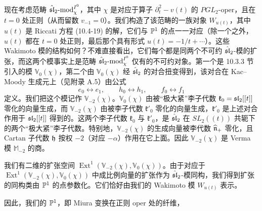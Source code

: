 现在考虑范畴 $\hat{\mathfrak{sl}}_2\text{-}\mathrm{mod}_\chi^{I^0}$，其中 $\chi$ 是对应于算子 $\partial_t^2-v(t)$ 的 $PGL_2$-oper，且在 $t=0$ 处正则（从而留数 $v_{-1}=0$）。我们构造了该范畴的一族对象 $W_{u(t)}$，其中 $u(t)$ 是 Riccati 方程 (10.4-19) 的解，它们与 $\mathbb{P}^1$ 的点一一对应（除一个之外，$u(t)$ 都在 $t=0$ 处正则，最后那个具有形式 $u(t)=-1/t+\cdots$）。这些 Wakimoto 模的结构如何？不难直接看出，它们每个都是同两个不可约 $\hat{\mathfrak{sl}}_2$-模的扩张，而这两个模事实上是范畴 $\hat{\mathfrak{sl}}_2\text{-}\mathrm{mod}_\chi^{I^0}$ 仅有的不可约对象。第一个是 10.3.3 节引入的模 $\mathbb{V}_0(\chi)$，第二个由 $\mathbb{V}_0(\chi)$ 经 $\hat{\mathfrak{sl}}_2$ 的对合扭变得到，该对合在 Kac--Moody 生成元上（见附录 A.5）由公式
\[
    e_0\leftrightarrow e_1,\qquad
    h_0\leftrightarrow h_1,\qquad
    f_0\leftrightarrow f_1
\]
定义。我们把这个模记作 $\mathbb{V}_{-2}(\chi)$。$\mathbb{V}_0(\chi)$ 由被“极大紧”李子代数 $\mathfrak{k}_0=\mathfrak{sl}_2[[t]]$ 零化的向量生成，而 $\mathbb{V}_{-2}(\chi)$ 由被李子代数 $\mathfrak{k}'_0$ 零化的向量生成，$\mathfrak{k}'_0$ 是上述对合作用于 $\mathfrak{sl}_2[[t]]$ 得到的。这两个李子代数 $\mathfrak{k}_0$ 与 $\mathfrak{k}'_0$，是 $\hat{\mathfrak{sl}}_2$ 在 $SL_2((t))$ 共轭下的两个“极大紧”李子代数。特别地，$\mathbb{V}_{-2}(\chi)$ 的生成向量被李代数 $\widehat{\mathfrak{n}}_+$ 零化，且 Cartan 子代数 $\mathfrak{h}$ 按权 $-2$（对应 $-\alpha$）作用在它上面。因此 $\mathbb{V}_{-2}(\chi)$ 是 Verma 模 $\mathbb{M}_{-2}$ 的商。

我们有二维的扩张空间 $\operatorname{Ext}^1(\mathbb{V}_{-2}(\chi),\mathbb{V}_0(\chi))$。由于对应于 $\operatorname{Ext}^1(\mathbb{V}_{-2}(\chi),\mathbb{V}_0(\chi))$ 中成比例向量的扩张作为 $\hat{\mathfrak{sl}}_2$-模同构，我们得到扩张的同构类由 $\mathbb{P}^1$ 的点参数化。它们恰好由我们的 Wakimoto 模 $W_{u(t)}$ 表示。

因此，我们的 $\mathbb{P}^1$，即 Miura 变换在正则 oper 处的纤维，
